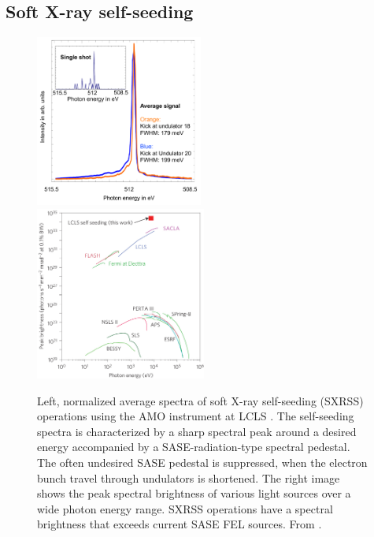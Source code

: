 \subsection{Soft X-ray self-seeding}
\begin{figure}
	\centering
		\includegraphics[width=0.49\textwidth]{images/Soft-X-ray-self-seeding.pdf}
		\includegraphics[width=0.50\textwidth]{images/spectral-brightness-fletcher-2015.jpg}
	\caption[Soft X-ray self-seeding spectra and brilliance of various lightsources.]{Left, normalized average spectra of soft X-ray self-seeding (SXRSS) operations using the AMO instrument at LCLS \cite[see][]{Bucher-2014-Unpublished}. The self-seeding spectra is characterized by a sharp spectral peak around a desired energy accompanied by a SASE-radiation-type spectral pedestal. The often undesired SASE pedestal is suppressed, when the electron bunch travel through undulators is shortened. The right image shows the peak spectral brightness of various light sources over a wide photon energy range. SXRSS operations have a spectral brightness that exceeds current SASE FEL sources. From \citep{Fletcher-2015-NatPho}.}
	\label{fig:soft-xray-self-seeding}
\end{figure}
